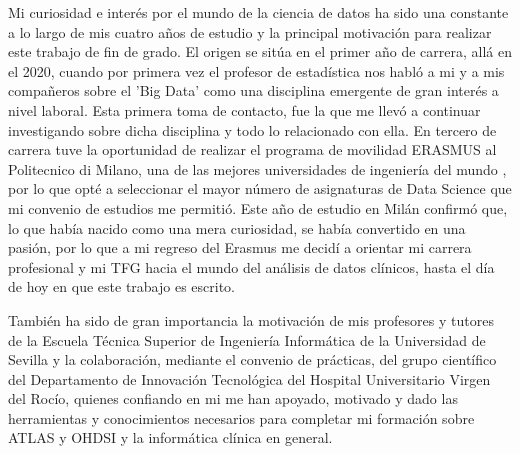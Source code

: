 
Mi curiosidad e interés por el mundo de la ciencia de datos ha sido una constante a lo largo de mis cuatro años de estudio y la principal motivación para realizar este trabajo de fin de grado. El origen se sitúa en el primer año de carrera, allá en el 2020, cuando por primera vez el profesor de estadística nos habló a mi y a mis compañeros sobre el 'Big Data' como una disciplina emergente de gran interés a nivel laboral. Esta primera toma de contacto, fue la que me llevó a continuar investigando sobre dicha disciplina y todo lo relacionado con ella. En tercero de carrera tuve la oportunidad de realizar el programa de movilidad ERASMUS al Politecnico di Milano, una de las mejores universidades de ingeniería del mundo \cite{QSPolimi}, por lo que opté a seleccionar el mayor número de asignaturas de Data Science que mi convenio de estudios me permitió. Este año de estudio en Milán confirmó que, lo que había nacido como una mera curiosidad, se había convertido en una pasión, por lo que a mi regreso del Erasmus me decidí a orientar mi carrera profesional y mi TFG hacia el mundo del análisis de datos clínicos, hasta el día de hoy en que este trabajo es escrito.

También ha sido de gran importancia la motivación de mis profesores y tutores de la Escuela Técnica Superior de Ingeniería Informática de la Universidad de Sevilla y la colaboración, mediante el convenio de prácticas, del grupo científico del Departamento de Innovación Tecnológica del Hospital Universitario Virgen del Rocío, quienes confiando en mi me han apoyado, motivado y dado las herramientas y conocimientos necesarios para completar mi formación sobre ATLAS y OHDSI y la informática clínica en general.
